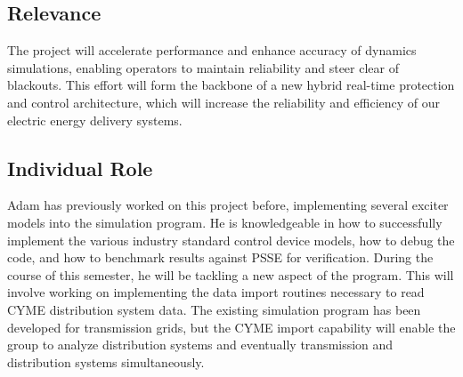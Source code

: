 \documentclass[]{article}
\begin{document}
\subsection{Relevance}
The project will accelerate performance and enhance accuracy of dynamics simulations, enabling operators to maintain reliability and steer clear of blackouts. This effort will form the backbone of a new hybrid real-time protection and control architecture, which will increase the reliability and efficiency of our electric energy delivery systems.
\subsection{Individual Role}
Adam has previously worked on this project before, implementing several exciter models into the simulation program. He is knowledgeable in how to successfully implement the various industry standard control device models, how to debug the code, and how to benchmark results against PSSE for verification. During the course of this semester, he will be tackling a new aspect of the program. This will involve  working on implementing the data import routines necessary to read CYME distribution system data. The existing simulation program has been developed for transmission grids, but the CYME import capability will enable the group to analyze distribution systems and eventually transmission and distribution systems simultaneously.
\end{document}
